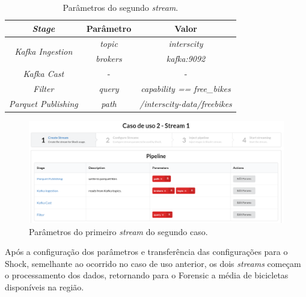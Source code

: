 \begin{table}[]
    \centering
    \caption{Parâmetros do segundo \textit{stream}.}
    \label{tab:case2-2}
    \begin{tabular}{|c|c|c|}
        \hline
        \textit{\textbf{Stage}}                   & \textbf{Parâmetro} & \textbf{Valor}                      \\ \hline
        \multirow{2}{*}{\textit{Kafka Ingestion}} & \textit{topic}     & \textit{interscity}                 \\ \cline{2-3} 
                                                  & \textit{brokers}   & \textit{kafka:9092}                 \\ \hline
                                                  \textit{Kafka Cast}                       & -                  & -                                   \\ \hline
                                                  \textit{Filter}                           & \textit{query}     & \textit{capability == free\_bikes}  \\ \hline
                                                  \textit{Parquet Publishing}               & \textit{path}      & \textit{/interscity-data/freebikes} \\ \hline
    \end{tabular}
\end{table}

\begin{figure}
  \centering
  \includegraphics[width=\textwidth]{figuras/caso2-1.png}
  \caption{Parâmetros do primeiro \textit{stream} do segundo caso.}
  \label{fig:case2}
\end{figure}

Após a configuração dos parâmetros e transferência das configurações para o
Shock, semelhante ao ocorrido no caso de uso anterior, os dois \textit{streams}
começam o processamento dos dados, retornando para o Forensic a média de
bicicletas disponíveis na região.
